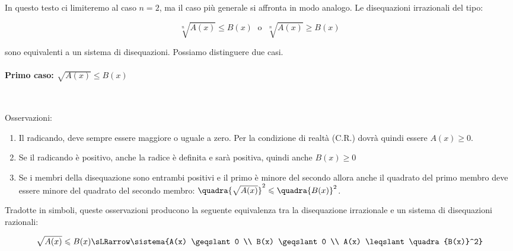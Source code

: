 In questo testo ci limiteremo al caso \(n=2\), ma il caso più 
generale si affronta in modo analogo. Le disequazioni irrazionali del tipo:

\[\sqrt[n]{A(x)} \leqslant B(x) \;\text{ o }\; \sqrt[n]{A(x)} \geqslant B(x)\]

sono equivalenti a un sistema di disequazioni. Possiamo 
distinguere due casi.

\paragraph{Primo caso: \(\sqrt{A(x)} \leqslant B(x)\)}
~

Osservazioni: 
\begin{enumerate} 
 \item Il radicando, deve sempre essere maggiore o uguale a zero. 
Per la condizione di realtà (C.R.) dovrà quindi essere \({A(x)} \geqslant 0\).
 \item Se il radicando è positivo, anche la radice è definita e sarà 
positiva, quindi anche \({B(x)} \geqslant 0\)
 \item Se i membri della disequazione sono entrambi positivi e il primo è 
minore 
del secondo allora anche il quadrato del primo membro deve essere minore del 
quadrato del secondo membro: 
\(\quadra{\sqrt{A(x)}}^2 \leqslant \quadra{B(x)}^2\).
\end{enumerate}

Tradotte in simboli, queste osservazioni producono la seguente equivalenza tra 
la disequazione irrazionale e un sistema di disequazioni razionali:

\[\sqrt{A(x)} \leqslant B(x) \sLRarrow 
  \sistema{A(x) \geqslant 0 \\ 
           B(x) \geqslant 0 \\ 
           A(x) \leqslant \quadra{B(x)}^2}\]

\newpage %

